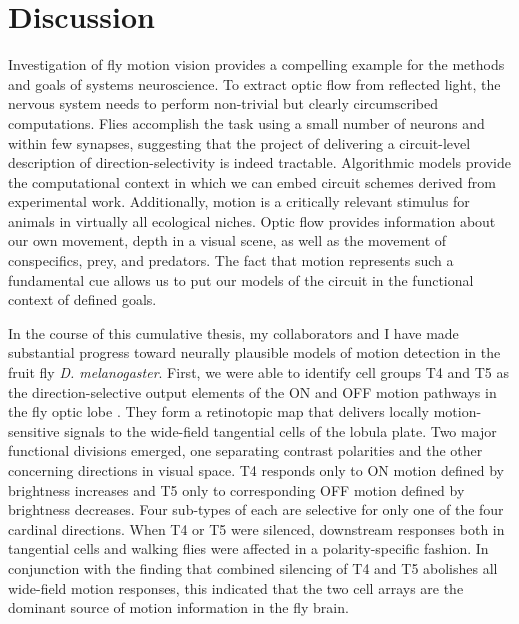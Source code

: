\chapter{Discussion}
\label{chp:discussion}

Investigation of fly motion vision provides a compelling example for the methods and goals of systems neuroscience. To extract optic flow from reflected light, the nervous system needs to perform non-trivial but clearly circumscribed computations. Flies accomplish the task using a small number of neurons and within few synapses, suggesting that the project of delivering a circuit-level description of direction-selectivity is indeed tractable. Algorithmic models provide the computational context in which we can embed circuit schemes derived from experimental work. Additionally, motion is a critically relevant stimulus for animals in virtually all ecological niches. Optic flow provides information about our own movement, depth in a visual scene, as well as the movement of conspecifics, prey, and predators. The fact that motion represents such a fundamental cue allows us to put our models of the circuit in the functional context of defined goals.

In the course of this cumulative thesis, my collaborators and I have made substantial progress toward neurally plausible models of motion detection in the fruit fly \textit{D. melanogaster}. First, we were able to identify cell groups T4 and T5 as the direction-selective output elements of the ON and OFF motion pathways in the fly optic lobe \citep{Maisak:2013kk}. They form a retinotopic map that delivers locally motion-sensitive signals to the wide-field tangential cells of the lobula plate. Two major functional divisions emerged, one separating contrast polarities and the other concerning directions in visual space. T4 responds only to ON motion defined by brightness increases and T5 only to corresponding OFF motion defined by brightness decreases. Four sub-types of each are selective for only one of the four cardinal directions. When T4 or T5 were silenced, downstream responses both in tangential cells and walking flies were affected in a polarity-specific fashion. In conjunction with the finding that combined silencing of T4 and T5 abolishes all wide-field motion responses, this indicated that the two cell arrays are the dominant source of motion information in the fly brain.

